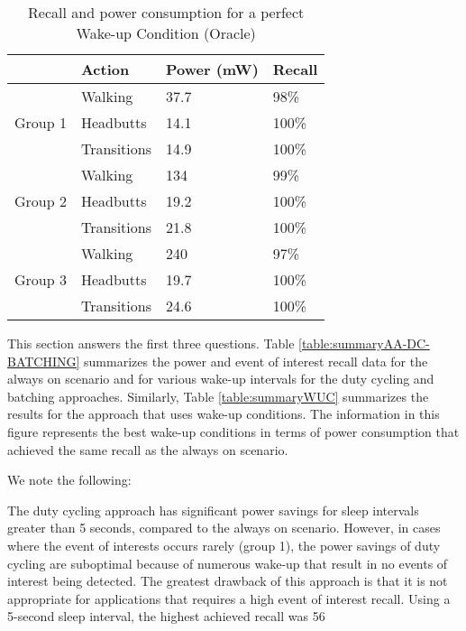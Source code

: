 \begin{table}[t]
    \begin{tabular}{|l|l|l|l|}
	\hline
    ~       					& Action      & Power (mW) & Recall \\ \hline
    \multirow{3}{*}{Group 1} 	& Walking     & 37.7       & 98\%   \\ \cline{2-4}
								& Headbutts   & 14.1       & 100\%  \\ \cline{2-4}
								& Transitions & 14.9       & 100\%  \\ \hline
	\multirow{3}{*}{Group 2} 	& Walking     & 134        & 99\%   \\ \cline{2-4}
								& Headbutts   & 19.2       & 100\%  \\ \cline{2-4}
								& Transitions & 21.8       & 100\%  \\ \hline
    \multirow{3}{*}{Group 3} 	& Walking     & 240        & 97\%   \\ \cline{2-4}
								& Headbutts   & 19.7       & 100\%  \\ \cline{2-4}
								& Transitions & 24.6       & 100\%  \\ \hline
    \end{tabular}
	\caption{Recall and power consumption for a perfect Wake-up Condition (Oracle)}
	\label{table:WUCoracle}
\end{table}

This section answers the first three questions. Table \ref{table:summaryAA-DC-BATCHING} summarizes the power and event of interest recall data for the always on scenario and for various wake-up intervals for the duty cycling and batching approaches. Similarly, Table \ref{table:summaryWUC} summarizes the results for the approach that uses wake-up conditions. The information in this figure represents the best wake-up conditions in terms of power consumption that achieved the same recall as the always on scenario.

We note the following:

The duty cycling approach has significant power savings for sleep intervals greater than 5 seconds, compared to the always on scenario. However, in cases where the event of interests occurs rarely (group 1), the power savings of duty cycling are suboptimal because of numerous wake-up that result in no events of interest being detected. The greatest drawback of this approach is that it is not appropriate for applications that requires a high event of interest recall. Using a 5-second sleep interval, the highest achieved recall was 56%

